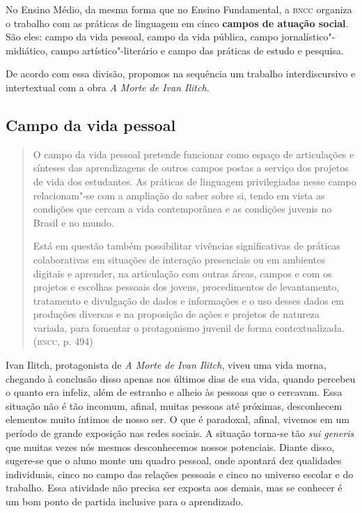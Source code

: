 \documentclass[12pt]{extarticle}
\begin{document}

No Ensino Médio, da mesma forma que no Ensino Fundamental, a \textsc{bncc}
organiza o trabalho com as práticas de linguagem em cinco \textbf{campos
de atuação social}. São eles: campo da vida pessoal, campo da vida
pública, campo jornalístico"-midiático, campo artístico"-literário e campo
das práticas de estudo e pesquisa.

De acordo com essa divisão, propomos na sequência um trabalho
interdiscursivo e intertextual com a obra \emph{A Morte de Ivan Ilitch.}

\subsection{Campo da vida pessoal}

\begin{quote}
O campo da vida pessoal pretende funcionar como espaço de articulações
e sínteses das aprendizagens de outros campos postas a serviço dos
projetos de vida dos estudantes. As práticas de linguagem privilegiadas
nesse campo relacionam"-se com a ampliação do saber sobre si, tendo em
vista as condições que cercam a vida contemporânea e as condições
juvenis no Brasil e no mundo.

Está em questão também possibilitar vivências significativas de práticas
colaborativas em situações de interação presenciais ou em ambientes
digitais e aprender, na articulação com outras áreas, campos e com os
projetos e escolhas pessoais dos jovens, procedimentos de levantamento,
tratamento e divulgação de dados e informações e o uso desses dados em
produções diversas e na proposição de ações e projetos de natureza
variada, para fomentar o protagonismo juvenil de forma
contextualizada. (\textsc{bncc}, p. 494)
\end{quote}

Ivan Ilitch, protagonista de \emph{A Morte de Ivan Ilitch}, viveu uma
vida morna, chegando à conclusão disso apenas nos últimos dias de sua
vida, quando percebeu o quanto era infeliz, além de estranho e alheio
às pessoas que o cercavam. Essa situação não é tão incomum, afinal,
muitas pessoas até próximas, desconhecem elementos muito íntimos de
nosso ser. O que é paradoxal, afinal, vivemos em um período de grande
exposição nas redes sociais. A situação torna-se tão \emph{sui
generis} que muitas vezes nós mesmos desconhecemos nossos potenciais.
Diante disso, sugere-se que o aluno monte um quadro pessoal, onde
apontará dez qualidades individuais, cinco no campo das relações
pessoais e cinco no universo escolar e do trabalho. Essa atividade não
precisa ser exposta aos demais, mas se conhecer é um bom ponto de
partida inclusive para o aprendizado.
\end{document}
